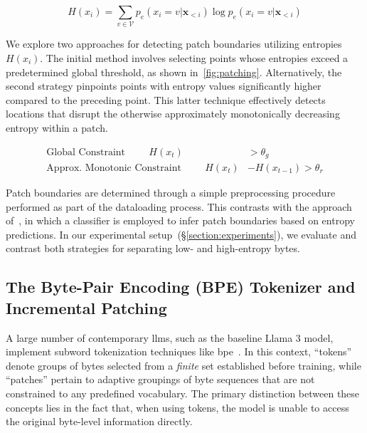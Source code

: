 \begin{equation}
H(x_i) = \sum_{v \in \mathcal{V}} p_{e}(x_i=v|\pmb{x}_{<i}) \log p_{e}(x_i=v|\pmb{x}_{<i})
\end{equation}

We explore two approaches for detecting patch boundaries utilizing entropies $H(x_i)$. The initial method involves selecting points whose entropies exceed a predetermined global threshold, as shown in~\autoref{fig:patching}. Alternatively, the second strategy pinpoints points with entropy values significantly higher compared to the preceding point. This latter technique effectively detects locations that disrupt the otherwise approximately monotonically decreasing entropy within a patch.

\begin{align*}
    \text{Global Constraint}\hspace{1cm}H(x_t)& > \theta_g\\
    \text{Approx. Monotonic Constraint}\hspace{1cm}H(x_t)& - H(x_{t-1}) > \theta_r
\end{align*}

Patch boundaries are determined through a simple preprocessing procedure performed as part of the dataloading process. This contrasts with the approach of~\citet{nawrot-etal-2023-efficient}, in which a classifier is employed to infer patch boundaries based on entropy predictions. In our experimental setup~(\S\ref{section:experiments}), we evaluate and contrast both strategies for separating low- and high-entropy bytes.

\subsection{The Byte-Pair Encoding (BPE) Tokenizer and Incremental Patching}
\label{section:incremental-patching}
\label{section:bpe-patch}

A large number of contemporary llms, such as the baseline Llama 3 model, implement subword tokenization techniques like bpe~\citep{gage1994new, sennrich-etal-2016-neural}. In this context, ``tokens'' denote groups of bytes selected from a \textit{finite} set established before training, while ``patches'' pertain to adaptive groupings of byte sequences that are not constrained to any predefined vocabulary. The primary distinction between these concepts lies in the fact that, when using tokens, the model is unable to access the original byte-level information directly.

